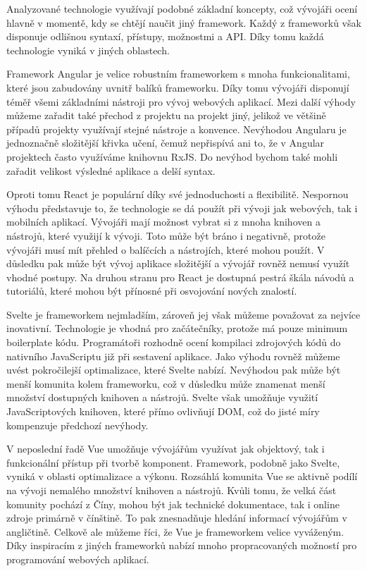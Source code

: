 \begin{zvyraznenyodstavec}
Analyzované technologie využívají podobné základní koncepty, což vývojáři ocení hlavně v momentě, kdy se chtějí naučit jiný framework. 
Každý z frameworků však disponuje odlišnou syntaxí, přístupy, možnostmi a API. Díky tomu každá technologie vyniká v jiných oblastech.

Framework Angular je velice robustním frameworkem s mnoha funkcionalitami, které jsou zabudovány uvnitř balíků frameworku. 
Díky tomu vývojáři disponují téměř všemi základními nástroji pro vývoj webových aplikací. 
Mezi další výhody můžeme zařadit také přechod z projektu na projekt jiný, jelikož ve většině případů projekty využívají stejné nástroje a konvence. 
Nevýhodou Angularu je jednoznačně složitější křivka učení, čemuž nepřispívá ani to, že v Angular projektech často využíváme knihovnu RxJS. 
Do nevýhod bychom také mohli zařadit velikost výsledné aplikace a delší syntax.

Oproti tomu React je populární díky své jednoduchosti a flexibilitě. 
Nespornou výhodu představuje to, že technologie se dá použít při vývoji jak webových, tak i mobilních aplikací. 
Vývojáři mají možnost vybrat si z mnoha knihoven a nástrojů, které využijí k vývoji. 
Toto může být bráno i negativně, protože vývojáři musí mít přehled o balíčcích a nástrojích, které mohou použít. 
V důsledku pak může být vývoj aplikace složitější a vývojář rovněž nemusí využít vhodné postupy. 
Na druhou stranu pro React je dostupná pestrá škála návodů a tutoriálů, které mohou být přínosné při osvojování nových znalostí.

Svelte je frameworkem nejmladším, zároveň jej však můžeme považovat za nejvíce inovativní. 
Technologie je vhodná pro začátečníky, protože má pouze minimum boilerplate kódu. 
Programátoři rozhodně ocení kompilaci zdrojových kódů do nativního JavaScriptu již při sestavení aplikace. 
Jako výhodu rovněž můžeme uvést pokročilejší optimalizace, které Svelte nabízí. 
Nevýhodou pak může být menší komunita kolem frameworku, což v důsledku může znamenat menší množství dostupných knihoven a nástrojů. 
Svelte však umožňuje využití JavaScriptových knihoven, které přímo ovlivňují DOM, což do jisté míry kompenzuje předchozí nevýhody.

V neposlední řadě Vue umožňuje vývojářům využívat jak objektový, tak i funkcionální přístup při tvorbě komponent. 
Framework, podobně jako Svelte, vyniká v oblasti optimalizace a výkonu. Rozsáhlá komunita Vue se aktivně podílí na vývoji nemalého množství knihoven a nástrojů. 
Kvůli tomu, že velká část komunity pochází z Číny, mohou být jak technické dokumentace, tak i online zdroje primárně v čínštině. 
To pak znesnadňuje hledání informací vývojářům v angličtině. Celkově ale můžeme říci, že Vue je frameworkem velice vyváženým. 
Díky inspiracím z jiných frameworků nabízí mnoho propracovaných možností pro programování webových aplikací.
\end{zvyraznenyodstavec}